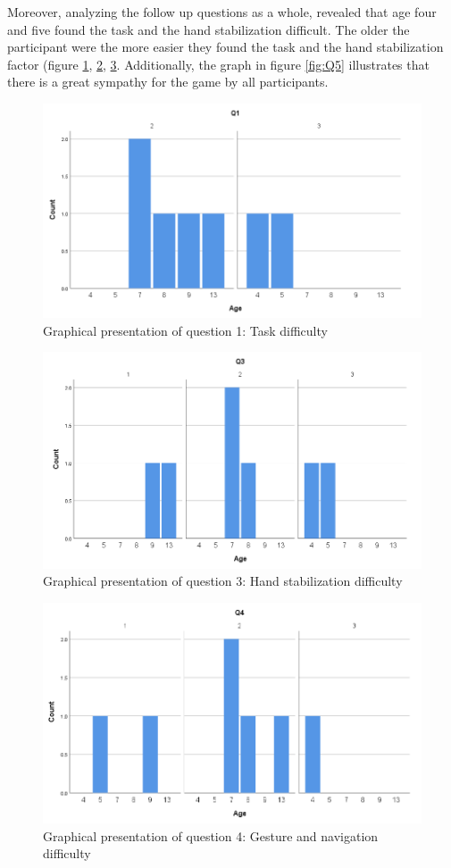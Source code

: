 Moreover, analyzing the follow up questions as a whole, revealed that age four and five found the task and the hand stabilization difficult. The older the participant were the more easier they found the task and the hand stabilization factor (figure \ref{fig:Q1}, \ref{fig:Q3}, \ref{fig:Q4}. Additionally, the graph in figure \ref{fig:Q5} illustrates that there is a great sympathy for the game by all participants.

\begin{figure}[!ht]
    \centering
    \includegraphics[width=.6\textwidth]{figures/Q1.png}
    \caption{Graphical presentation of question 1: Task difficulty}
    \label{fig:Q1}
\end{figure}
\begin{figure}[!ht]
    \centering
    \includegraphics[width=.6\textwidth]{figures/Q3.png}
    \caption{Graphical presentation of question 3: Hand stabilization difficulty}
    \label{fig:Q3}
\end{figure}
\begin{figure}[!ht]
    \centering
    \includegraphics[width=.6\textwidth]{figures/Q4.png}
    \caption{Graphical presentation of question 4: Gesture and navigation difficulty}
    \label{fig:Q4}
\end{figure}
